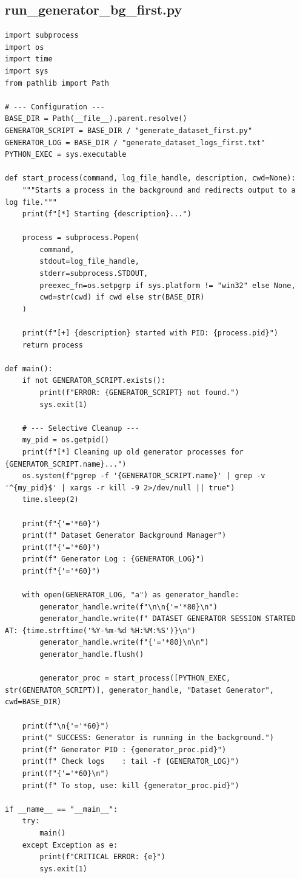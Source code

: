 \documentclass[11pt]{article}
\begin{document}
\subsection{run\_generator\_bg\_first.py}
\begin{lstlisting}[style=pythonstyle, caption={run\_generator\_bg\_first.py}]
import subprocess
import os
import time
import sys
from pathlib import Path

# --- Configuration ---
BASE_DIR = Path(__file__).parent.resolve()
GENERATOR_SCRIPT = BASE_DIR / "generate_dataset_first.py"
GENERATOR_LOG = BASE_DIR / "generate_dataset_logs_first.txt"
PYTHON_EXEC = sys.executable

def start_process(command, log_file_handle, description, cwd=None):
    """Starts a process in the background and redirects output to a log file."""
    print(f"[*] Starting {description}...")
    
    process = subprocess.Popen(
        command,
        stdout=log_file_handle,
        stderr=subprocess.STDOUT,
        preexec_fn=os.setpgrp if sys.platform != "win32" else None,
        cwd=str(cwd) if cwd else str(BASE_DIR)
    )
    
    print(f"[+] {description} started with PID: {process.pid}")
    return process

def main():
    if not GENERATOR_SCRIPT.exists():
        print(f"ERROR: {GENERATOR_SCRIPT} not found.")
        sys.exit(1)

    # --- Selective Cleanup ---
    my_pid = os.getpid()
    print(f"[*] Cleaning up old generator processes for {GENERATOR_SCRIPT.name}...")
    os.system(f"pgrep -f '{GENERATOR_SCRIPT.name}' | grep -v '^{my_pid}$' | xargs -r kill -9 2>/dev/null || true")
    time.sleep(2) 

    print(f"{'='*60}")
    print(f" Dataset Generator Background Manager")
    print(f"{'='*60}")
    print(f" Generator Log : {GENERATOR_LOG}")
    print(f"{'='*60}")

    with open(GENERATOR_LOG, "a") as generator_handle:
        generator_handle.write(f"\n\n{'='*80}\n")
        generator_handle.write(f" DATASET GENERATOR SESSION STARTED AT: {time.strftime('%Y-%m-%d %H:%M:%S')}\n")
        generator_handle.write(f"{'='*80}\n\n")
        generator_handle.flush()

        generator_proc = start_process([PYTHON_EXEC, str(GENERATOR_SCRIPT)], generator_handle, "Dataset Generator", cwd=BASE_DIR)

    print(f"\n{'='*60}")
    print(" SUCCESS: Generator is running in the background.")
    print(f" Generator PID : {generator_proc.pid}")
    print(f" Check logs    : tail -f {GENERATOR_LOG}")
    print(f"{'='*60}\n")
    print(f" To stop, use: kill {generator_proc.pid}")

if __name__ == "__main__":
    try:
        main()
    except Exception as e:
        print(f"CRITICAL ERROR: {e}")
        sys.exit(1)
\end{lstlisting}
\end{document}
